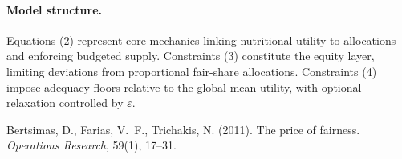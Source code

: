 \documentclass[preprint,12pt]{elsarticle}
\begin{document}
\paragraph{Model structure.}
Equations (2) represent core mechanics linking nutritional utility to allocations and enforcing budgeted supply. Constraints (3) constitute the equity layer, limiting deviations from proportional fair-share allocations. Constraints (4) impose adequacy floors relative to the global mean utility, with optional relaxation controlled by $\varepsilon$.


\begin{thebibliography}{99}

Bertsimas, D., Farias, V.~F., Trichakis, N. (2011).
The price of fairness.
\emph{Operations Research}, 59(1), 17--31.


\end{thebibliography}
\end{document}
